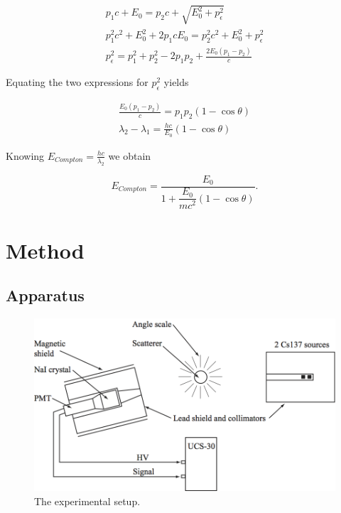 \documentclass{article}
\begin{document}
\begin{gather}
	p_1 c + E_0 = p_2 c + \sqrt{E_0^2 + p_{\epsilon}^2}\\
	p_1^2 c^2 + E_0^2  + 2p_1 c E_0= p_2^2 c^2 + E_0^2 + p_{\epsilon}^2\\
	p_{\epsilon}^2 = p_1^2 + p_2^2 - 2p_1p_2 + \frac{2E_0(p_1 - p_2)}{c}
\end{gather}

Equating the two expressions for $p_{\epsilon}^2$ yields

\begin{gather}
	\frac{E_0 (p_1 - p_2)}{c} = p_1 p_2 (1 - \cos \theta)\\
	\lambda_2 - \lambda_1 = \frac{hc}{E_0} (1 - \cos \theta)
\end{gather}

Knowing $E_{Compton} = \frac{hc}{\lambda_2}$ we obtain

\begin{equation}
	E_{Compton} = \dfrac{E_0}{1+\dfrac{E_0}{mc^{2}}(1-\cos \theta)}.
\end{equation}

\section{Method}
\subsection{Apparatus}


\begin{figure}[!htb]
	\centering
	\includegraphics[scale=.8]{plots/Compton_apparatus.png}
  	\caption{The experimental setup.} 
 	\label{Apparatus}
\end{figure}
\end{document}
